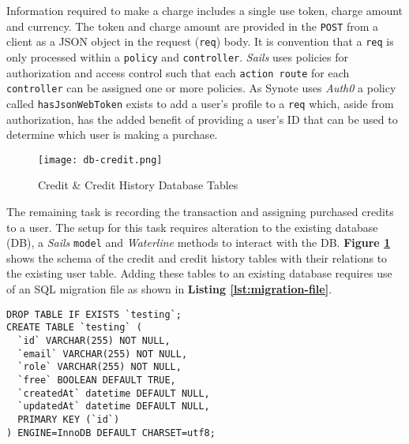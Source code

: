 Information required to make a charge includes a single use token, charge amount and currency. The token and charge amount are provided in the \texttt{POST} from a client as a JSON object in the request (\texttt{req}) body. It is convention that a \texttt{req} is only processed within a \texttt{policy} and \texttt{controller}. \textit{Sails} uses policies for authorization and access control such that each \texttt{action route} for each \texttt{controller} can be assigned one or more policies. As Synote uses \textit{Auth0} \cite{auth0} a policy called \texttt{hasJsonWebToken} exists to add a user's profile to a \texttt{req} which, aside from authorization, has the added benefit of providing a user's ID that can be used to determine which user is making a purchase.\\

\begin{figure}[!hbt]
  \centering
 	\texttt{[image: db-credit.png]}
  \caption{Credit \& Credit History Database Tables}
 	\label{fig:db-credit}
\end{figure}

The remaining task is recording the transaction and assigning purchased credits to a user. The setup for this task requires alteration to the existing database (DB), a \textit{Sails} \texttt{model} and \textit{Waterline} methods to interact with the DB. \textbf{Figure \ref{fig:db-credit}} shows the schema of the credit and credit history tables with their relations to the existing user table. Adding these tables to an existing database requires use of an SQL migration file as shown in \textbf{Listing \ref{lst:migration-file}}.\\

\hspace{0.1\textwidth}
\begin{minipage}{.72\textwidth}
\begin{listing}[H]
\begin{verbatim}
DROP TABLE IF EXISTS `testing`;
CREATE TABLE `testing` (
  `id` VARCHAR(255) NOT NULL,
  `email` VARCHAR(255) NOT NULL,
  `role` VARCHAR(255) NOT NULL,
  `free` BOOLEAN DEFAULT TRUE,
  `createdAt` datetime DEFAULT NULL,
  `updatedAt` datetime DEFAULT NULL,
  PRIMARY KEY (`id`)
) ENGINE=InnoDB DEFAULT CHARSET=utf8;

\end{verbatim}
\label{lst:migration-file}
\end{listing}
\end{minipage}
\hspace{0.1\textwidth}
\vspace{0.3cm}

